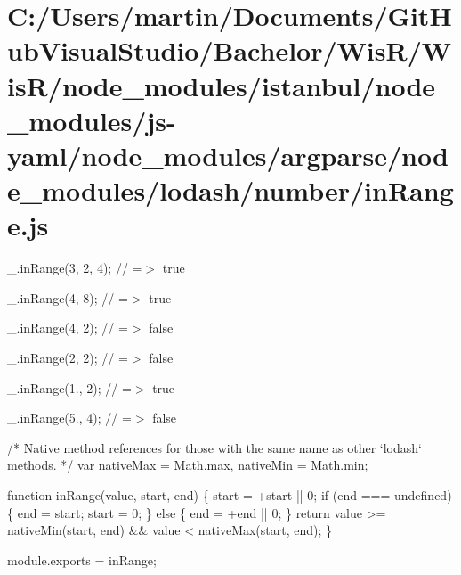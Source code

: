 \hypertarget{_c_1_2_users_2martin_2_documents_2_git_hub_visual_studio_2_bachelor_2_wis_r_2_wis_r_2node_modulef8c0dd72a8fd557af7c65ca7970ad020}{}\section{C\+:/\+Users/martin/\+Documents/\+Git\+Hub\+Visual\+Studio/\+Bachelor/\+Wis\+R/\+Wis\+R/node\+\_\+modules/istanbul/node\+\_\+modules/js-\/yaml/node\+\_\+modules/argparse/node\+\_\+modules/lodash/number/in\+Range.\+js}
\+\_\+.\+in\+Range(3, 2, 4); // =$>$ true

\+\_\+.\+in\+Range(4, 8); // =$>$ true

\+\_\+.\+in\+Range(4, 2); // =$>$ false

\+\_\+.\+in\+Range(2, 2); // =$>$ false

\+\_\+.\+in\+Range(1., 2); // =$>$ true

\+\_\+.\+in\+Range(5., 4); // =$>$ false


\begin{DoxyCodeInclude}
\textcolor{comment}{/* Native method references for those with the same name as other `lodash` methods. */}
var nativeMax = Math.max,
    nativeMin = Math.min;

\textcolor{keyword}{function} inRange(value, start, end) \{
  start = +start || 0;
  \textcolor{keywordflow}{if} (end === undefined) \{
    end = start;
    start = 0;
  \} \textcolor{keywordflow}{else} \{
    end = +end || 0;
  \}
  \textcolor{keywordflow}{return} value >= nativeMin(start, end) && value < nativeMax(start, end);
\}

module.exports = inRange;
\end{DoxyCodeInclude}
 